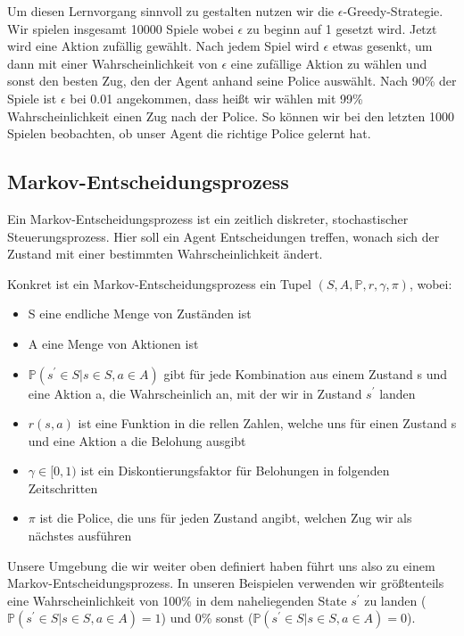 Um diesen Lernvorgang sinnvoll zu gestalten nutzen wir die $\epsilon$-Greedy-Strategie. Wir spielen insgesamt 10000 Spiele wobei $\epsilon$ zu beginn auf 1 gesetzt wird. Jetzt wird eine Aktion zufällig gewählt. Nach jedem Spiel wird $\epsilon$ etwas gesenkt, um dann mit einer Wahrscheinlichkeit von $\epsilon$ eine zufällige Aktion zu wählen und sonst den besten Zug, den der Agent anhand seine Police auswählt. Nach 90\% der Spiele ist $\epsilon$ bei 0.01 angekommen, dass heißt wir wählen mit 99\% Wahrscheinlichkeit einen Zug nach der Police. So können wir bei den letzten 1000 Spielen beobachten, ob unser Agent die richtige Police gelernt hat.

\subsection{Markov-Entscheidungsprozess}
\label{subsec:mdp}

Ein Markov-Entscheidungsprozess ist ein zeitlich diskreter, stochastischer Steuerungsprozess. Hier soll ein Agent Entscheidungen treffen, wonach sich der Zustand mit einer bestimmten Wahrscheinlichkeit ändert.

Konkret ist ein Markov-Entscheidungsprozess ein Tupel $(S, A, \mathbb{P}, r, \gamma, \pi)$, wobei:

\begin{itemize}
 \item S eine endliche Menge von Zuständen ist
 \item A eine Menge von Aktionen ist
 \item $\mathbb{P}(s^{\prime} \in S | s \in S, a \in A)$ gibt für jede Kombination aus einem Zustand s und eine Aktion a, die Wahrscheinlich an, mit der wir in Zustand $s^{\prime}$ landen
 \item $r(s,a)$ ist eine Funktion in die rellen Zahlen, welche uns für einen Zustand s und eine Aktion a die Belohung ausgibt
 \item $\gamma \in [0,1)$ ist ein Diskontierungsfaktor für Belohungen in folgenden Zeitschritten
 \item $\pi$ ist die Police, die uns für jeden Zustand angibt, welchen Zug wir als nächstes ausführen
\end{itemize}

Unsere Umgebung die wir weiter oben definiert haben führt uns also zu einem Markov-Entscheidungsprozess.  In unseren Beispielen verwenden wir größtenteils eine Wahrscheinlichkeit von 100\% in dem naheliegenden State $s^{\prime}$ zu landen ($\mathbb{P}(s^{\prime} \in S | s \in S, a \in A) = 1$)  und 0\% sonst ($\mathbb{P}(s^{\prime} \in S | s \in S, a \in A) = 0$).

